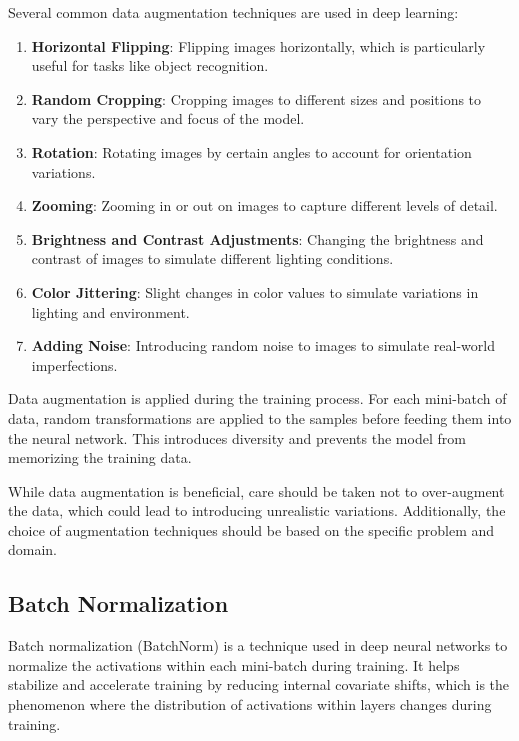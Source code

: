 \documentclass{report}
\begin{document}
Several common data augmentation techniques are used in deep learning:
\begin{enumerate}
	\item \textbf{Horizontal Flipping}: Flipping images horizontally, which is particularly useful for tasks like object recognition.

	\item \textbf{Random Cropping}: Cropping images to different sizes and positions to vary the perspective and focus of the model.

	\item \textbf{Rotation}: Rotating images by certain angles to account for orientation variations.

	\item \textbf{Zooming}: Zooming in or out on images to capture different levels of detail.

	\item \textbf{Brightness and Contrast Adjustments}: Changing the brightness and contrast of images to simulate different lighting conditions.

	\item \textbf{Color Jittering}: Slight changes in color values to simulate variations in lighting and environment.

	\item \textbf{Adding Noise}: Introducing random noise to images to simulate real-world imperfections.
\end{enumerate}

Data augmentation is applied during the training process. For each mini-batch of data, random transformations are applied to the samples before feeding them into the neural network. This introduces diversity and prevents the model from memorizing the training data.

While data augmentation is beneficial, care should be taken not to over-augment the data, which could lead to introducing unrealistic variations. Additionally, the choice of augmentation techniques should be based on the specific problem and domain.

\subsection{Batch Normalization}

Batch normalization (BatchNorm) is a technique used in deep neural networks to normalize the activations within each mini-batch during training. It helps stabilize and accelerate training by reducing internal covariate shifts, which is the phenomenon where the distribution of activations within layers changes during training.
\end{document}
